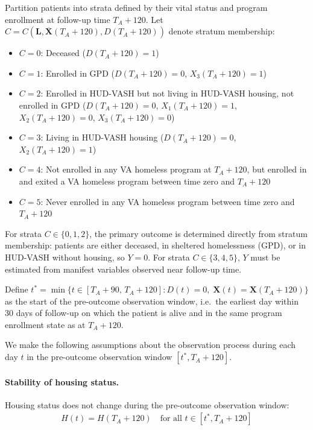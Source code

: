 Partition patients into strata defined by their vital status and program enrollment at follow-up time $T_A + 120$. Let $C=C(\boldsymbol{L}, \overline{\boldsymbol{X}}(T_A + 120), D(T_A + 120))$ denote stratum membership:

\begin{itemize}
    \item $C=0$: Deceased ($D(T_A + 120)=1$)
    \item $C=1$: Enrolled in GPD ($D(T_A + 120)=0$, $X_3(T_A + 120)=1$)
    \item $C=2$: Enrolled in HUD-VASH but not living in HUD-VASH housing, not enrolled in GPD ($D(T_A + 120)=0$, $X_1(T_A + 120)=1$, $X_2(T_A + 120)=0$, $X_3(T_A + 120)=0$)
    \item $C=3$: Living in HUD-VASH housing ($D(T_A + 120)=0$, $X_2(T_A + 120)=1$)
    \item $C=4$: Not enrolled in any VA homeless program at $T_A + 120$, but enrolled in and exited a VA homeless program between time zero and $T_A + 120$
    \item $C=5$: Never enrolled in any VA homeless program between time zero and $T_A + 120$
\end{itemize}

For strata $C \in \{0, 1, 2\}$, the primary outcome is determined directly from stratum membership: patients are either deceased, in sheltered homelessness (GPD), or in HUD-VASH without housing, so $Y = 0$. For strata $C \in \{3, 4, 5\}$, $Y$ must be estimated from manifest variables observed near follow-up time.

Define $t^* = \min\{t \in [T_A+90,\, T_A+120] : D(t)=0,\; \boldsymbol{X}(t)=\boldsymbol{X}(T_A+120)\}$ as the start of the pre-outcome observation window, i.e.\ the earliest day within 30 days of follow-up on which the patient is alive and in the same program enrollment state as at $T_A + 120$.

We make the following assumptions about the observation process during each day $t$ in the pre-outcome observation window $[t^*, T_A + 120]$.

\paragraph{Stability of housing status.} Housing status does not change during the pre-outcome observation window:
\begin{align*}
    H(t) = H(T_A + 120) \quad \text{for all } t \in [t^*, T_A + 120]
\end{align*}

